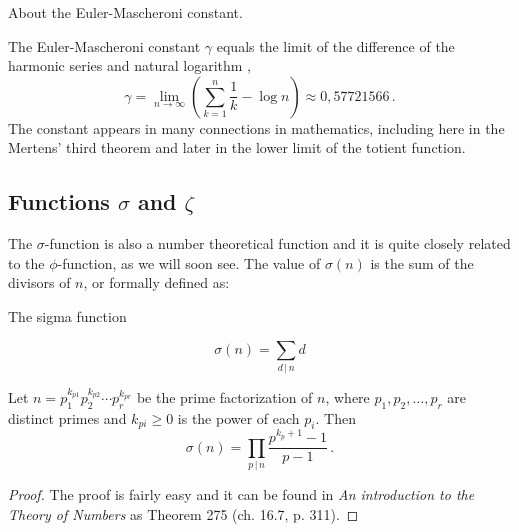 \documentclass{article}
\begin{document}
\begin{remark}
About the Euler-Mascheroni constant.

The Euler-Mascheroni constant $\gamma$ equals the limit of the difference of the harmonic series and natural logarithm \emph{\cite{gamma}},
\begin{equation*}
    \gamma=\lim_{n\rightarrow\infty} \left(\sum_{k=1}^n \frac{1}{k} - \log n\right) \approx 0,57721566\,.
\end{equation*}
The constant appears in many connections in mathematics, including here in the Mertens' third theorem and later in the lower limit of the totient function.

\end{remark}

\subsection{Functions $\sigma$ and $\zeta$}

The $\sigma$-function is also a number theoretical function and it is quite closely related to the $\phi$-function, as we will soon see. The value of $\sigma(n)$ is the sum of the divisors of $n$, or formally defined as:

\begin{definition}
The sigma function

\begin{equation*}
    \sigma(n)=\sum_{d\,\vert\, n} d
\end{equation*}
\end{definition}

\begin{lemma}
\label{lemma:sigma}
Let $n=p_1^{k_{p1}}p_2^{k_{p2}}\cdots p_r^{k_{pr}}$ be the prime factorization of $n$, where $p_1,p_2,\dots,p_r$ are distinct primes and $k_{pi}\geq0$ is the power of each $p_i$. Then
\begin{equation*}
    \sigma(n) = \prod_{p\,\vert\, n} \frac{p^{k_p+1}-1}{p-1}\,.
\end{equation*}

\begin{proof}

The proof is fairly easy and it can be found in \textit{An introduction to the Theory of Numbers} \cite{HardyWright} as Theorem 275 (ch. 16.7, p. 311).
\end{proof}
\end{lemma}
\end{document}
